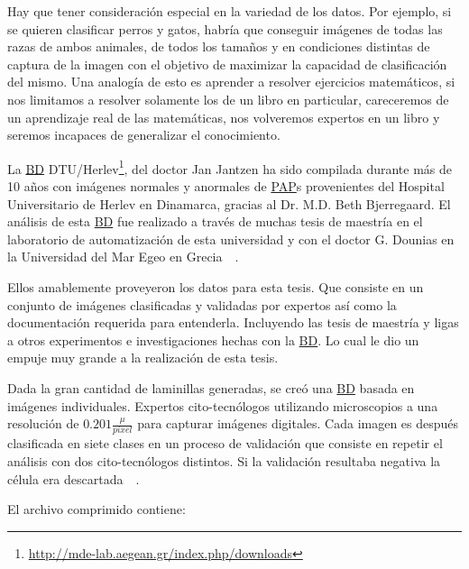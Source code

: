 Hay que tener consideración especial en la variedad de los datos. Por ejemplo,
si se quieren clasificar perros y gatos, habría que conseguir imágenes de todas
las razas de ambos animales, de todos los tamaños y en condiciones distintas de
captura de la imagen con el objetivo de maximizar la capacidad de clasificación
del mismo. Una analogía de esto es aprender a resolver ejercicios matemáticos,
si nos limitamos a resolver solamente los de un libro en particular, careceremos
de un aprendizaje real de las matemáticas, nos volveremos expertos en un libro y
seremos incapaces de generalizar el conocimiento.

La \hyperlink{abbr}{BD} DTU/Herlev\footnote{\url{http://mde-lab.aegean.gr/index.php/downloads}}, del doctor Jan Jantzen
ha sido compilada durante más de 10 años con imágenes normales y anormales de
\hyperlink{abbr}{PAP}s provenientes del Hospital Universitario de Herlev en
Dinamarca, gracias al Dr. M.D. Beth Bjerregaard. El análisis de esta
\hyperlink{abbr}{BD} fue realizado a través de muchas tesis de maestría en el
laboratorio de automatización de esta universidad y con el doctor G. Dounias en
la Universidad del Mar Egeo en Grecia~\cite{MBE-LAB}~\cite{Jantzen2005}. 

Ellos amablemente proveyeron los datos para esta tesis. Que consiste en un
conjunto de imágenes clasificadas y validadas por expertos así como la
documentación requerida para entenderla. Incluyendo las tesis de maestría y
ligas a otros experimentos e investigaciones hechas con la \hyperlink{abbr}{BD}.
Lo cual le dio un empuje muy grande a la realización de esta tesis.

Dada la gran cantidad de laminillas generadas, se creó una \hyperlink{abbr}{BD}
basada en imágenes individuales. Expertos cito-tecnólogos utilizando
microscopios a una resolución de \(0.201  \frac{\mu}{pixel}\) para capturar imágenes
digitales. Cada imagen es después clasificada en siete clases en un proceso de
validación que consiste en repetir el análisis con dos cito-tecnólogos
distintos. Si la validación resultaba negativa la célula era descartada~\cite{Norup2005}~\cite{Martin2003}. 

El archivo comprimido contiene:

